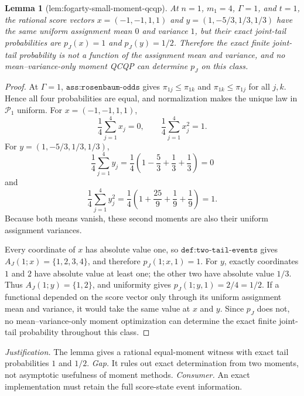 \documentclass{article}
\newtheorem{lemma}{Lemma}
\begin{document}
\begin{lemma}[lem:fogarty-small-moment-qcqp]\label{lem:fogarty-small-moment-qcqp}
At \(n=1\), \(m_1=4\), \(\Gamma=1\), and \(t=1\), the rational score vectors \(x=(-1,-1,1,1)\) and \(y=(1,-5/3,1/3,1/3)\) have the same uniform assignment mean \(0\) and variance \(1\), but their exact joint-tail probabilities are \(p_J(x)=1\) and \(p_J(y)=1/2\). Therefore the exact finite joint-tail probability is not a function of the assignment mean and variance, and no mean--variance-only moment QCQP can determine \(p_J\) on this class.
\end{lemma}
\begin{proof}
At \(\Gamma=1\), \(\texttt{ass:rosenbaum-odds}\) gives \(\pi_{1j}\le\pi_{1k}\) and \(\pi_{1k}\le\pi_{1j}\) for all \(j,k\). Hence all four probabilities are equal, and normalization makes the unique law in \(\mathcal P_1\) uniform. For \(x=(-1,-1,1,1)\),
\[
\frac14\sum_{j=1}^4x_j=0,
\qquad
\frac14\sum_{j=1}^4x_j^2=1.
\]
For \(y=(1,-5/3,1/3,1/3)\),
\[
\frac14\sum_{j=1}^4y_j
 =\frac14\left(1-\frac53+\frac13+\frac13\right)=0
\]
and
\[
\frac14\sum_{j=1}^4y_j^2
 =\frac14\left(1+\frac{25}{9}+\frac19+\frac19\right)=1.
\]
Because both means vanish, these second moments are also their uniform assignment variances.

Every coordinate of \(x\) has absolute value one, so \(\texttt{def:two-tail-events}\) gives \(A_J(1;x)=\{1,2,3,4\}\), and therefore \(p_J(1;x,1)=1\). For \(y\), exactly coordinates \(1\) and \(2\) have absolute value at least one; the other two have absolute value \(1/3\). Thus \(A_J(1;y)=\{1,2\}\), and uniformity gives \(p_J(1;y,1)=2/4=1/2\). If a functional depended on the score vector only through its uniform assignment mean and variance, it would take the same value at \(x\) and \(y\). Since \(p_J\) does not, no mean--variance-only moment optimization can determine the exact finite joint-tail probability throughout this class.
\end{proof}
\par\smallskip\noindent \textit{Justification.} The lemma gives a rational equal-moment witness with exact tail probabilities \(1\) and \(1/2\). \textit{Gap.} It rules out exact determination from two moments, not asymptotic usefulness of moment methods. \textit{Consumer.} An exact implementation must retain the full score-state event information.
\end{document}
